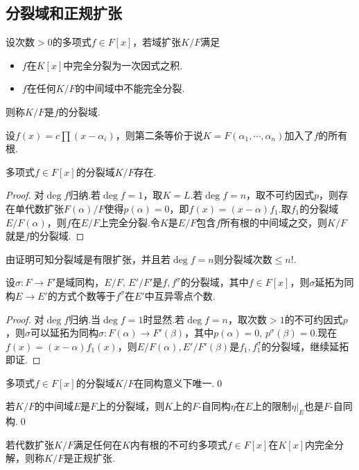 \subsection{分裂域和正规扩张}
\begin{definition}
    设次数$>0$的多项式$f\in F[x]$，若域扩张$K/F$满足
    \begin{itemize}
        \item $f$在$K[x]$中完全分裂为一次因式之积.
        \item $f$在任何$K/F$的中间域中不能完全分裂.
    \end{itemize}
    则称$K/F$是$f$的{\heiti 分裂域}.
\end{definition}
\begin{remark}
    设$f(x)=c\prod(x-\alpha_i)$，则第二条等价于说$K=F(\alpha_1,\cdots,\alpha_n)$加入了$f$的所有根.
\end{remark}
\begin{thm}
    多项式$f\in F[x]$的分裂域$K/F$存在.
\end{thm}
\begin{proof}
    对$\deg f$归纳.若$\deg f=1$，取$K=L$.若$\deg f=n$，取不可约因式$p$，则存在单代数扩张$F(\alpha)/F$使得$p(\alpha)=0$，即$f(x)=(x-\alpha)f_1$.取$f_1$的分裂域$E/F(\alpha)$，则$f$在$E/F$上完全分裂.令$K$是$E/F$包含$f$所有根的中间域之交，则$K/F$就是$f$的分裂域.
\end{proof}
\begin{remark}
    由证明可知分裂域是有限扩张，并且若$\deg f=n$则分裂域次数$\le n!$.
\end{remark}
\begin{lemma*}
    设$\sigma\colon F\to F'$是域同构，$E/F,\,E'/F'$是$f,f^\sigma$的分裂域，其中$f\in F[x]$，则$\sigma$延拓为同构$E\to E'$的方式个数等于$f^\sigma$在$E'$中互异零点个数.
\end{lemma*}
\begin{proof}
    对$\deg f$归纳.当$\deg f=1$时显然.若$\deg f=n$，取次数$>1$的不可约因式$p$，则$\sigma$可以延拓为同构$\sigma\colon F(\alpha)\to F'(\beta)$，其中$p(\alpha)=0,\,p^\sigma(\beta)=0$.现在$f(x)=(x-\alpha)f_1(x)$，则$E/F(\alpha),E'/F'(\beta)$是$f_1,f_1^\sigma$的分裂域，继续延拓即证.
\end{proof}
\begin{cor*}
    多项式$f\in F[x]$的分裂域$K/F$在同构意义下唯一.\qed
\end{cor*}
\begin{cor*}
    若$K/F$的中间域$E$是$F$上的分裂域，则$K$上的$F$-自同构$\eta$在$E$上的限制$\eta|_E$也是$F$-自同构.\qed
\end{cor*}
\begin{definition}
    若代数扩张$K/F$满足任何在$K$内有根的不可约多项式$f\in F[x]$在$K[x]$内完全分解，则称$K/F$是{\heiti 正规扩张}.
\end{definition}

